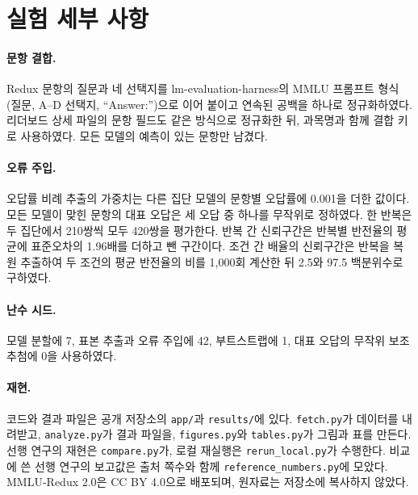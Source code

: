 \documentclass[11pt]{article}
\begin{document}
\section{실험 세부 사항}
\label{app:details}

\paragraph{문항 결합.}
Redux 문항의 질문과 네 선택지를 lm-evaluation-harness의 MMLU 프롬프트 형식(질문, A--D 선택지, ``Answer:'')으로 이어 붙이고 연속된 공백을 하나로 정규화하였다. 리더보드 상세 파일의 문항 필드도 같은 방식으로 정규화한 뒤, 과목명과 함께 결합 키로 사용하였다. 모든 모델의 예측이 있는 문항만 남겼다.

\paragraph{오류 주입.}
오답률 비례 추출의 가중치는 다른 집단 모델의 문항별 오답률에 0.001을 더한 값이다. 모든 모델이 맞힌 문항의 대표 오답은 세 오답 중 하나를 무작위로 정하였다. 한 반복은 두 집단에서 210쌍씩 모두 420쌍을 평가한다. 반복 간 신뢰구간은 반복별 반전율의 평균에 표준오차의 1.96배를 더하고 뺀 구간이다. 조건 간 배율의 신뢰구간은 반복을 복원 추출하여 두 조건의 평균 반전율의 비를 1,000회 계산한 뒤 2.5와 97.5 백분위수로 구하였다.

\paragraph{난수 시드.}
모델 분할에 7, 표본 추출과 오류 주입에 42, 부트스트랩에 1, 대표 오답의 무작위 보조 추첨에 0을 사용하였다.

\paragraph{재현.}
코드와 결과 파일은 공개 저장소의 \texttt{app/}과 \texttt{results/}에 있다. \texttt{fetch.py}가 데이터를 내려받고, \texttt{analyze.py}가 결과 파일을, \texttt{figures.py}와 \texttt{tables.py}가 그림과 표를 만든다. 선행 연구의 재현은 \texttt{compare.py}가, 로컬 재실행은 \texttt{rerun\_local.py}가 수행한다. 비교에 쓴 선행 연구의 보고값은 출처 쪽수와 함께 \texttt{reference\_numbers.py}에 모았다. MMLU-Redux 2.0은 CC BY 4.0으로 배포되며, 원자료는 저장소에 복사하지 않았다.
\end{document}
